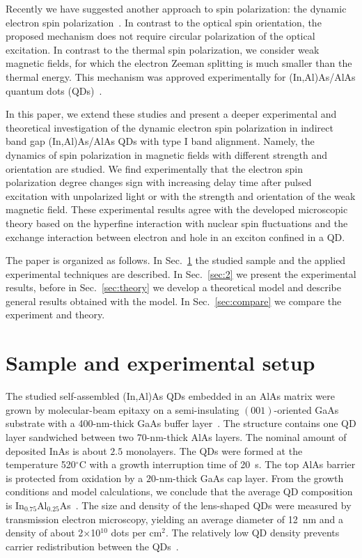 \documentclass[twocolumn,showpacs,preprintnumbers,amsmath,amssymb,aps]{revtex4-1}
\begin{document}
Recently we have suggested another approach to spin polarization:
the dynamic electron spin polarization~\cite{Smirnov125}. In
contrast to the optical spin orientation, the proposed mechanism
does not require circular polarization of the optical excitation. In
contrast to the thermal spin polarization, we consider  weak
magnetic fields, for which the electron Zeeman splitting is much
smaller than the thermal energy. This mechanism was approved
experimentally for (In,Al)As/AlAs quantum dots
(QDs)~\cite{Smirnov125}.

In this paper, we extend these studies and present a deeper
experimental and theoretical investigation of the dynamic electron
spin polarization in indirect band gap (In,Al)As/AlAs QDs with type
I band alignment. Namely, the dynamics of spin polarization in magnetic
fields with different strength and orientation are studied. We
find experimentally that the electron spin polarization degree
changes sign with increasing delay time after pulsed excitation with unpolarized light or
with the strength and orientation of the weak magnetic field. These
experimental results agree with the developed microscopic theory based
on the hyperfine interaction with nuclear spin fluctuations and the
exchange interaction between electron and hole in an exciton confined in a QD.

The paper is organized as follows. In Sec.~\ref{sec:1} the studied sample
and the applied experimental techniques are described. In
Sec.~\ref{sec:2} we present the experimental results, before in
Sec.~\ref{sec:theory} we develop a theoretical model and describe
general results obtained with the model. In Sec.~\ref{sec:compare} we compare
the experiment and theory.

\section{Sample and experimental setup}
\label{sec:1}

The studied self-assembled (In,Al)As QDs embedded in an AlAs matrix
were grown by molecular-beam epitaxy on a semi-insulating
$(001)$-oriented GaAs substrate with a 400-nm-thick GaAs buffer
layer~\cite{Shamirzaev78}. The structure contains one QD layer
sandwiched between two 70-nm-thick AlAs layers. The nominal amount
of  deposited  InAs is about $2.5$ monolayers. The QDs were formed
at the temperature 520$^{\circ}$C with a growth interruption time
of 20~s. The top AlAs barrier is protected from oxidation by a
$20$-nm-thick GaAs cap layer. From the growth conditions and model
calculations, we conclude that the average QD composition is
In$_{0.75}$Al$_{0.25}$As~\cite{Shamirzaev78}. The size and density of
the lens-shaped QDs were measured by transmission electron
microscopy, yielding an average diameter of 12~nm and a density of
about 2$\times$10$^{10}$ dots per cm$^2$. The relatively low QD
density prevents carrier redistribution between the
QDs~\cite{ShamirzaevAPL97,ShamirzaevSST}.
\end{document}
